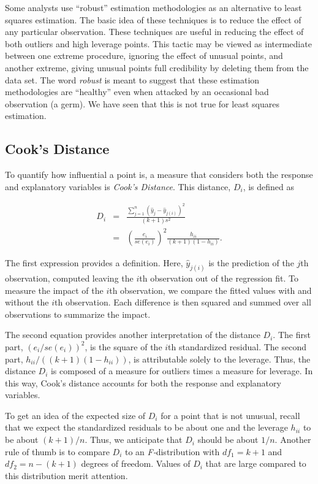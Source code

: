Some analysts use ``robust'' estimation methodologies as an
alternative to least squares estimation. The basic idea of these
techniques is to reduce the effect of any particular observation.
These techniques are useful in reducing the effect of both outliers
and high leverage points. This tactic may be viewed as intermediate
between one extreme procedure, ignoring the effect of unusual
points, and another extreme, giving unusual points full credibility
by deleting them from the data set. The word \textit{robust }is
meant to suggest that these estimation methodologies are ``healthy''
even when attacked by an occasional bad observation (a germ). We
have seen that this is not true for least squares estimation.

\subsection{Cook's Distance}

To quantify how influential a point is, a measure that considers
both the response and explanatory variables is \textit{Cook's
Distance}. This distance, $D_i$, is defined as

\begin{eqnarray}\label{E5:CooksD}
D_i &=&\frac{\sum_{j=1}^{n}(\hat{y}_j-\hat{y}_{j(i)})^2}{(k+1)s^2} \\
&=&\left(\frac{e_i}{se(e_i)}\right)^2\frac{h_{ii}}{(k+1)(1-h_{ii})}.
\nonumber
\end{eqnarray}

\noindent The first expression provides a definition. Here,
$\hat{y}_{j(i)}$ is the prediction of the $j$th observation,
computed leaving the $i$th observation out of the regression fit. To
measure the impact of the $i$th observation, we compare the fitted
values with and without the $i$th observation. Each difference is
then squared and summed over all observations to summarize the
impact.

The second equation provides another interpretation of the distance
$D_i$. The first part, $(e_i/se(e_i))^2$, is the square of the $i$th
standardized residual. The second part, $h_{ii}/((k+1)(1-h_{ii}))$,
is attributable solely to the leverage. Thus, the distance $D_i$ is
composed of a measure for outliers times a measure for leverage. In
this way, Cook's distance accounts for both the response and
explanatory variables.

To get an idea of the expected size of $D_i$ for a point that is not
unusual, recall that we expect the standardized residuals to be
about one
and the leverage $h_{ii}$ to be about $(k+1)/n$. Thus, we anticipate that $%
D_i$ should be about $1/n$. Another rule of thumb is to compare
$D_i$ to an \textit{F-}distribution with $df_1=k+1$ and
$df_2=n-(k+1)$ degrees of freedom. Values of $D_i$ that are large
compared to this distribution merit attention.

